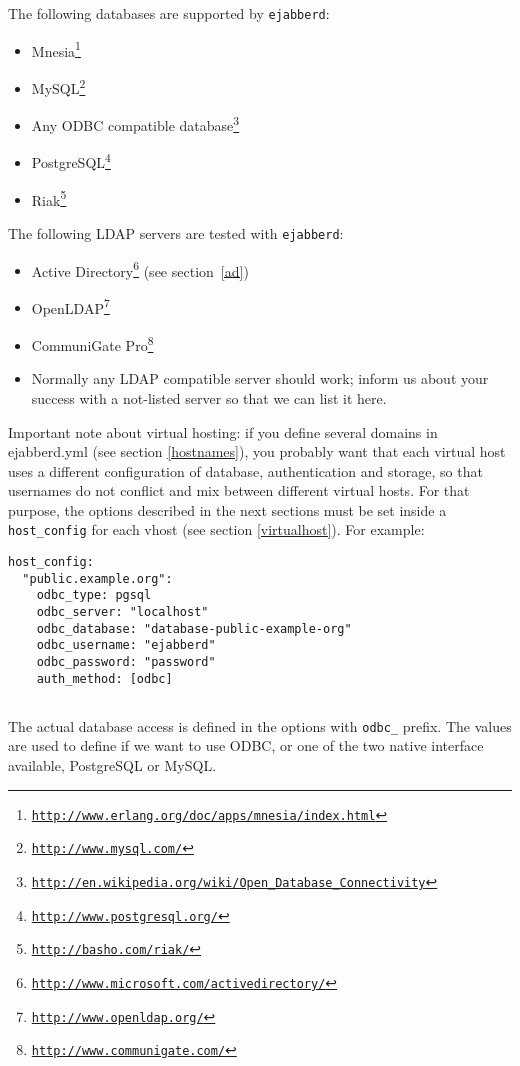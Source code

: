 \documentclass[a4paper,10pt]{book}
\newcommand{\ind}[1]{\begin{latexonly}\index{#1}\end{latexonly}}
\newcommand{\makesubsection}[2]{ \aname{#1}{} \subsection{\ahrefloc{#1}{#2}} \label{#1} }
\newcommand{\term}[1]{\texttt{#1}}
\newcommand{\ejabberd}{\texttt{ejabberd}}
\gdef\footahref#1#2{#2\footnote{\href{#1}{\texttt{#1}}}}
\begin{document}
The following databases are supported by \ejabberd{}:
\begin{itemize}
\item \footahref{http://www.erlang.org/doc/apps/mnesia/index.html}{Mnesia}
\item \footahref{http://www.mysql.com/}{MySQL}
\item \footahref{http://en.wikipedia.org/wiki/Open\_Database\_Connectivity}{Any ODBC compatible database}
\item \footahref{http://www.postgresql.org/}{PostgreSQL}
\item \footahref{http://basho.com/riak/}{Riak}
\end{itemize}

The following LDAP servers are tested with \ejabberd{}:
\begin{itemize}
\item \footahref{http://www.microsoft.com/activedirectory/}{Active Directory}
  (see section~\ref{ad})
\item \footahref{http://www.openldap.org/}{OpenLDAP}
\item \footahref{http://www.communigate.com/}{CommuniGate Pro}
\item Normally any LDAP compatible server should work; inform us about your
  success with a not-listed server so that we can list it here.
\end{itemize}

Important note about virtual hosting:
if you define several domains in ejabberd.yml (see section \ref{hostnames}),
you probably want that each virtual host uses a different configuration of database, authentication and storage,
so that usernames do not conflict and mix between different virtual hosts.
For that purpose, the options described in the next sections
must be set inside a \term{host\_config} for each vhost (see section \ref{virtualhost}).
For example:
\begin{verbatim}
host_config:
  "public.example.org":
    odbc_type: pgsql
    odbc_server: "localhost"
    odbc_database: "database-public-example-org"
    odbc_username: "ejabberd"
    odbc_password: "password"
    auth_method: [odbc]
\end{verbatim}


\makesubsection{odbc}{ODBC}\ind{odbc}

The actual database access is defined in the options with \term{odbc\_} prefix. The
values are used to define if we want to use ODBC, or one of the two native
interface available, PostgreSQL or MySQL.
\end{document}
